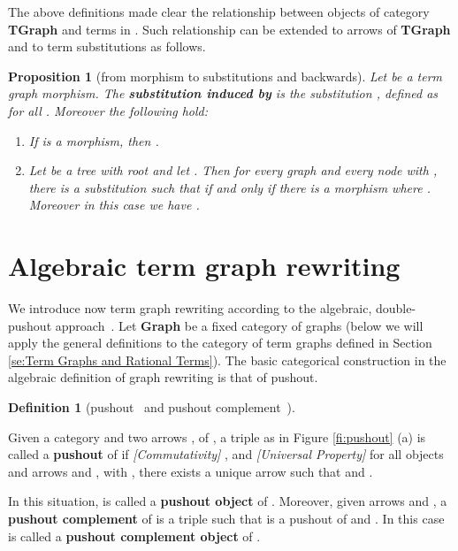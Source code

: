 \documentclass{eptcs}
\theoremstyle{plain}
\newtheorem{proposition}[theorem]{Proposition}
\theoremstyle{definition}
\newtheorem{definition}[theorem]{Definition}
\begin{document}
The above definitions made clear the relationship between objects of
category {\bf TGraph} and terms in . Such 
relationship 
can be extended to arrows of {\bf TGraph} and to term 
substitutions 
as follows.

\begin{proposition}
[from morphism to substitutions and backwards]
\label{pr:morphisms}
Let   be a term graph morphism. The {\bf substitution induced by } is 
the  
substitution , defined as  for all . Moreover the following 
hold:
\begin{enumerate}
\item
If  is a morphism, then 
.

\item
Let  be a tree with root  and let . Then for every
graph  and every node  with 
,
there is a substitution  such that  {\em if and 
only if}
there is a morphism  where
. Moreover in  
this
case we have .
\end{enumerate}
\end{proposition} 

\section{Algebraic term graph rewriting}
\label{se:Algebraic term graph rewriting}

We introduce now term graph rewriting according to the algebraic, 
double-pushout approach~\cite{Ehr:TIAA}. 
Let {\bf Graph} be a fixed category of graphs (below we will apply the 
general definitions to the category of term graphs defined in Section 
\ref{se:Term Graphs and Rational Terms}). The basic categorical 
construction in the 
algebraic definition of graph rewriting is that of pushout.

\begin{definition}
[pushout~\cite{ML:CWM} and pushout complement~\cite{Ehr:TIAA}]
\label{de:pushout} 

Given a category  and two arrows ,  of , a triple    as in Figure 
\ref{fi:pushout} (a)
is called a {\bf pushout \/} of    if 
{\em[Commutativity]} , and 
{\em [Universal Property]} for all objects  and arrows 
 and , with , there exists a unique arrow 
such that  and .

In this situation,  is called a {\bf pushout object} of  .
Moreover, given arrows  and ,
a {\bf pushout complement \/} of    is a 
triple
  such that    is
a pushout of  and . In this case  is called a {\bf pushout
complement object \/} of  .
\end{definition}
\end{document}
